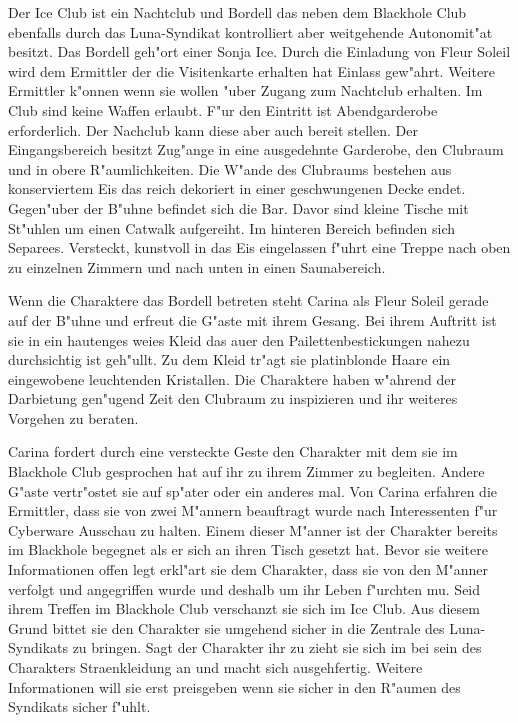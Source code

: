 
Der Ice Club ist ein Nachtclub und Bordell das neben dem Blackhole Club ebenfalls durch das Luna-Syndikat kontrolliert aber weitgehende Autonomit"at besitzt. Das Bordell geh"ort einer Sonja Ice. Durch die Einladung von Fleur Soleil wird dem Ermittler der die Visitenkarte erhalten hat Einlass gew"ahrt. Weitere Ermittler k"onnen wenn sie wollen "uber \xl{} Zugang zum Nachtclub erhalten. Im Club sind keine Waffen erlaubt. F"ur den Eintritt ist Abendgarderobe erforderlich. Der Nachclub kann diese aber auch bereit stellen. Der Eingangsbereich besitzt Zug"ange in eine ausgedehnte Garderobe, den Clubraum und in obere R"aumlichkeiten. Die W"ande des Clubraums bestehen aus konserviertem Eis das reich dekoriert in einer geschwungenen Decke endet. Gegen"uber der B"uhne befindet sich die Bar. Davor sind kleine Tische mit St"uhlen um einen Catwalk aufgereiht. Im hinteren Bereich befinden sich Separees. Versteckt, kunstvoll in das Eis eingelassen f"uhrt eine Treppe nach oben zu einzelnen Zimmern und nach unten in einen Saunabereich.

Wenn die Charaktere das Bordell betreten steht Carina als Fleur Soleil gerade auf der B"uhne und erfreut die G"aste mit ihrem Gesang. Bei ihrem Auftritt ist sie in ein hautenges wei\3es Kleid das au\3er den Pailettenbestickungen nahezu durchsichtig ist geh"ullt. Zu dem Kleid tr"agt sie platinblonde Haare ein eingewobene leuchtenden Kristallen. Die Charaktere haben w"ahrend der Darbietung gen"ugend Zeit den Clubraum zu inspizieren und ihr weiteres Vorgehen zu beraten.

Carina fordert durch eine versteckte Geste den Charakter mit dem sie im Blackhole Club gesprochen hat auf ihr zu ihrem Zimmer zu begleiten. Andere G"aste vertr"ostet sie auf sp"ater oder ein anderes mal. Von Carina erfahren die Ermittler, dass sie von zwei M"annern beauftragt wurde nach Interessenten f"ur Cyberware Ausschau zu halten. Einem dieser M"anner ist der Charakter bereits im Blackhole begegnet als er sich an ihren Tisch gesetzt hat. Bevor sie weitere Informationen offen legt erkl"art sie dem Charakter, dass sie von den M"anner verfolgt und angegriffen wurde und deshalb um ihr Leben f"urchten mu\3. Seid ihrem Treffen im Blackhole Club verschanzt sie sich im Ice Club. Aus diesem Grund bittet sie den Charakter sie umgehend sicher in die Zentrale des Luna-Syndikats zu bringen. Sagt der Charakter ihr zu zieht sie sich im bei sein des Charakters Stra\3enkleidung an und macht sich ausgehfertig. Weitere Informationen will sie erst preisgeben wenn sie sicher in den R"aumen des Syndikats sicher f"uhlt.

